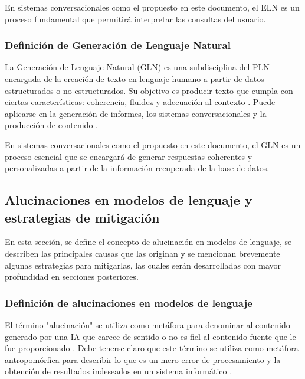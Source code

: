 En sistemas conversacionales como el propuesto en este documento, el ELN es un proceso fundamental que permitirá interpretar las consultas del usuario.

\subsubsection{Definición de Generación de Lenguaje Natural}
\label{subsec:definicion_gln}

La Generación de Lenguaje Natural (GLN) es una subdisciplina del PLN encargada de la creación de texto en lenguaje humano a partir de datos estructurados o no estructurados. Su objetivo es producir texto que cumpla con ciertas características: coherencia, fluidez y adecuación al contexto \cite{munoz2024procesamiento}. Puede aplicarse en la generación de informes, los sistemas conversacionales y la producción de contenido \cite{munoz2024procesamiento}.

En sistemas conversacionales como el propuesto en este documento, el GLN es un proceso esencial que se encargará de generar respuestas coherentes y personalizadas a partir de la información recuperada de la base de datos.

\subsection{Alucinaciones en modelos de lenguaje y estrategias de mitigación}
\label{sec:alucinaciones_modelos_lenguaje}

En esta sección, se define el concepto de alucinación en modelos de lenguaje, se describen las principales causas que las originan y se mencionan brevemente algunas estrategias para mitigarlas, las cuales serán desarrolladas con mayor profundidad en secciones posteriores.

\subsubsection{Definición de alucinaciones en modelos de lenguaje}
\label{subsec:definicion_alucinaciones}

El término "alucinación" se utiliza como metáfora para denominar al contenido generado por una IA que carece de sentido o no es fiel al contenido fuente que le fue proporcionado \cite{navarro2025alucinaciones}. Debe tenerse claro que este término se utiliza como metáfora antropomórfica para describir lo que es un mero error de procesamiento y la obtención de resultados indeseados en un sistema informático \cite{navarro2025alucinaciones}.

